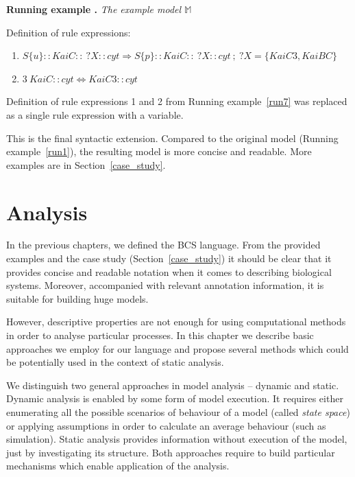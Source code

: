 \documentclass[12pt, twoside]{fithesis2} %
\newcounter{counter}[section]
\renewcommand{\thecounter}{\thesection.\arabic{counter}}
\newenvironment{runningExample}[1]{\bigskip\refstepcounter{counter}\noindent\textbf{Running example \thecounter} \emph{#1} \par\nopagebreak}{\bigskip}
\begin{document}
\begin{runningExample}{The example model $\mathds{M}$}
\label{run8}
\noindent Definition of rule expressions:
{\small
\begin{enumerate}
\item \hspace*{-0.6cm} $S\{u\}::KaiC::~?X::cyt \Rightarrow S\{p\}::KaiC::~?X::cyt ~;~ ?X = \{KaiC3, KaiBC\}$

\item \hspace*{-0.6cm} $3~KaiC::cyt \Leftrightarrow KaiC3::cyt$
\end{enumerate}
}
\end{runningExample}

\noindent Definition of rule expressions 1 and 2 from Running example~\ref{run7} was replaced as a single rule expression with a variable.

This is the final syntactic extension. Compared to the original model (Running example~\ref{run1}), the resulting model is more concise and readable. More examples are in Section~\ref{case_study}.

\chapter{Analysis}
\label{analysis}

In the previous chapters, we defined the BCS language. From the provided examples and the case study (Section~\ref{case_study}) it should be clear that it provides concise and readable notation when it comes to describing biological systems. Moreover, accompanied with relevant annotation information, it is suitable for building huge models.

However, descriptive properties are not enough for using computational methods in order to analyse particular processes. In this chapter we describe basic approaches we employ for our language and propose several methods which could be potentially used in the context of static analysis.

We distinguish two general approaches in model analysis -- dynamic and static. Dynamic analysis is enabled by some form of model execution. It requires either enumerating all the possible scenarios of behaviour of a model (called \emph{state space}) or applying assumptions in order to calculate an average behaviour (such as simulation). Static analysis provides information without execution of the model, just by investigating its structure. Both approaches require to build particular mechanisms which enable application of the analysis.
\end{document}

